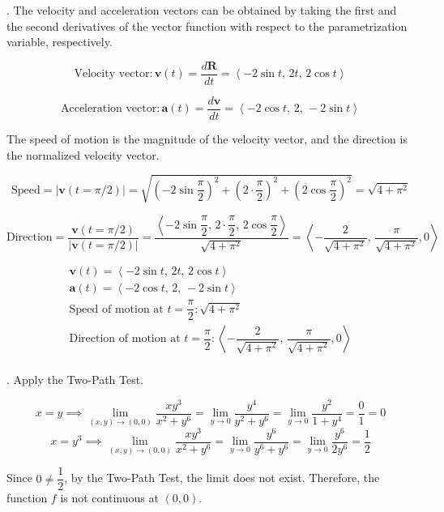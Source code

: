 \documentclass{article}
\begin{document}
\hfill

. The velocity and acceleration vectors can be obtained by taking the first and the second derivatives of the vector function with respect to the parametrization variable, respectively.

\[\text{Velocity vector}:\mathbf v(t)=\frac{d\mathbf R}{dt}=\left\langle-2\sin t,\,2t,\,2\cos t\right\rangle\]

\[\text{Acceleration vector}:\mathbf a(t)=\frac{d\mathbf v}{dt}=\left\langle-2\cos t,\,2,\,-2\sin t\right\rangle\]

\hfill

\noindent The speed of motion is the magnitude of the velocity vector, and the direction is the normalized velocity vector.

\[\text{Speed}=\left|\mathbf v(t=\pi/2)\right|=\sqrt{\left(-2\sin\frac\pi2\right)^2+\left(2\cdot\frac\pi2\right)^2+\left(2\cos\frac\pi2\right)^2}=\sqrt{4+\pi^2}\]

\[\text{Direction}=\frac{\mathbf v(t=\pi/2)}{\left|\mathbf v(t=\pi/2)\right|}=\frac{\left\langle-2\sin\dfrac\pi2,\,2\cdot\dfrac\pi2,\,2\cos\dfrac\pi2\right\rangle}{\sqrt{4+\pi^2}}=\left\langle-\frac2{\sqrt{4+\pi^2}},\,\frac\pi{\sqrt{4+\pi^2}},0\right\rangle\]

\hfill

\[\boxed{\begin{array}{c}
\mathbf v(t)=\left\langle-2\sin t,\,2t,\,2\cos t\right\rangle\\
\mathbf a(t)=\left\langle-2\cos t,\,2,\,-2\sin t\right\rangle\\[1em]
\text{Speed of motion at }t=\dfrac\pi2:\sqrt{4+\pi^2}\\
\text{Direction of motion at }t=\dfrac\pi2:\left\langle-\dfrac2{\sqrt{4+\pi^2}},\,\dfrac\pi{\sqrt{4+\pi^2}},0\right\rangle\\
\end{array}}\]

\newpage

. Apply the Two-Path Test.

\[x=y\implies\lim_{(x,y)\to(0,0)}\frac{xy^3}{x^2+y^6}=\lim_{y\to0}\frac{y^4}{y^2+y^6}=\lim_{y\to0}\frac{y^2}{1+y^4}=\frac01=0\]
\[x=y^3\implies\lim_{(x,y)\to(0,0)}\frac{xy^3}{x^2+y^6}=\lim_{y\to0}\frac{y^6}{y^6+y^6}=\lim_{y\to0}\frac{y^6}{2y^6}=\frac12\]

\hfill

\noindent Since $0\neq\dfrac12$, by the Two-Path Test, the limit does not exist. Therefore, the function $f$ is not continuous at $(0,0)$.
\end{document}
